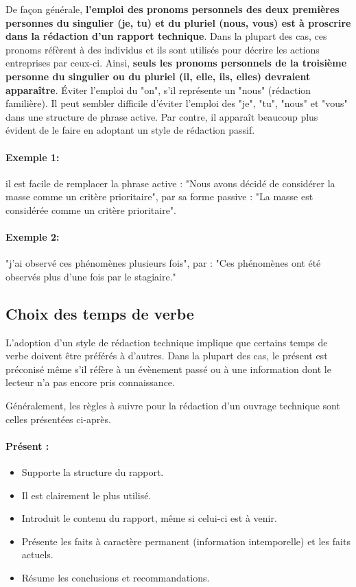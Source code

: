 \documentclass[12pt]{article} 	%
\begin{document}
{De façon générale, {\bfseries{l’emploi des pronoms personnels des deux premières personnes du singulier (je, tu) et du pluriel (nous, vous) est à proscrire dans la rédaction d’un rapport technique}}. Dans la plupart des cas, ces pronoms réfèrent à des individus et ils sont utilisés pour décrire les actions entreprises par ceux-ci. Ainsi,  {\bfseries{seuls les pronoms personnels de la troisième personne du singulier ou du pluriel (il, elle, ils, elles) devraient apparaître}}.  Éviter l’emploi du "on", s’il représente un "nous" (rédaction familière). 
Il peut sembler difficile d’éviter l’emploi des "je", "tu", "nous" et "vous" dans une structure de phrase active. Par contre, il apparaît beaucoup plus évident de le faire en adoptant un style de rédaction passif. 

\paragraph{Exemple 1:} il est facile de remplacer la phrase active : "Nous avons décidé de considérer la masse comme un critère prioritaire", par sa forme passive : "La masse est considérée comme un critère prioritaire".  

\paragraph{Exemple 2:} "j’ai observé ces phénomènes plusieurs fois", par : "Ces phénomènes ont été observés plus d’une fois par le stagiaire."
\subsection{Choix des temps de verbe}
L’adoption d’un style de rédaction technique implique que certains temps de verbe doivent être préférés à d’autres. Dans la plupart des cas, le présent est préconisé même s’il réfère à un évènement passé ou à une information dont le lecteur n’a pas encore pris connaissance. 

Généralement, les règles à suivre pour la rédaction d’un ouvrage technique sont celles présentées ci-après. 
\paragraph{{\bfseries{Présent :}}}
\begin{itemize}
    \item    Supporte la structure du rapport. 
    \item    Il est clairement le plus utilisé. 
    \item    Introduit le contenu du rapport, même si celui-ci est à venir.
    \item    Présente les faits à caractère permanent (information intemporelle) et les faits actuels. 
    \item    Résume les conclusions et recommandations. 
\end{itemize}


}
\end{document}
